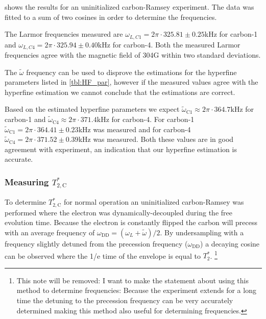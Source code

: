  shows the results for an uninitialized carbon-Ramsey experiment.
The data was fitted to a sum of two cosines in order to determine the frequencies.

The Larmor frequencies measured are $\omega_{L,C1} = 2\pi\cdot 325.81 \pm 0.25$kHz  for carbon-1 and  $\omega_{L,C4} =  2\pi\cdot 325.94 \pm 0.40$kHz for carbon-4.
Both the measured Larmor frequencies agree with the magnetic field of 304G within two standard deviations.

The $\tilde{\omega}$ frequency can be used to disprove the estimations for the hyperfine parameters listed in \cref{tbl:HF_par}, however if the measured values agree with the hyperfine estimation we cannot conclude that the estimations are correct.

Based on the estimated hyperfine parameters we expect $\tilde\omega_{\mathrm{C1}} \approx 2\pi\cdot 364.7\mathrm{kHz}$ for carbon-1 and $\tilde \omega_{\mathrm{C4}} \approx 2\pi\cdot 371.4 \mathrm{kHz}$ for carbon-4.
For carbon-1 $\tilde \omega_{\mathrm{C1}}= 2\pi\cdot 364.41 \pm 0.23$kHz was measured
and for carbon-4 $\tilde \omega_{\mathrm{C4}} = 2\pi\cdot 371.52 \pm 0.39 $kHz was measured.
Both these values are in good agreement with experiment, an indication that our hyperfine estimation is accurate.


\subsubsection{Measuring $T_{2,\mathrm{C}}^* $}
To determine $T_{2,\mathrm{C}}^* $ for normal operation an uninitialized carbon-Ramsey was performed where the electron was dynamically-decoupled during the free evolution time.
Because the electron is constantly flipped the carbon will precess with an average frequency of $\omega_{\mathrm{DD}} = (\omega_L +\tilde{\omega} )/2$.
By undersampling with a frequency slightly detuned from the precession frequency ($\omega_{\mathrm{DD}}$) a decaying cosine can be observed where the 1/e time of the envelope is equal to $T_2^*$. \footnote{This note will be removed: I want to make the statement about using this method to determine frequencies: Because the experiment extends for a long time the detuning to the precession frequency can be very accurately determined making this method also useful for determining frequencies.}

